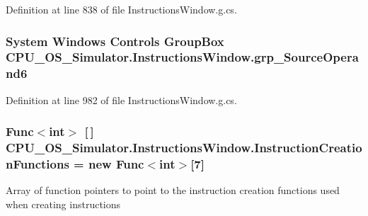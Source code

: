 Definition at line 838 of file Instructions\+Window.\+g.\+cs.

\hypertarget{class_c_p_u___o_s___simulator_1_1_instructions_window_a46c1f50385d01108637e574343a99bfd}{}
\subsubsection[{grp\+\_\+\+Source\+Operand6}]{\setlength{\rightskip}{0pt plus 5cm}System Windows Controls Group\+Box C\+P\+U\+\_\+\+O\+S\+\_\+\+Simulator.\+Instructions\+Window.\+grp\+\_\+\+Source\+Operand6\hspace{0.3cm}{\ttfamily [package]}}\label{class_c_p_u___o_s___simulator_1_1_instructions_window_a46c1f50385d01108637e574343a99bfd}


Definition at line 982 of file Instructions\+Window.\+g.\+cs.

\hypertarget{class_c_p_u___o_s___simulator_1_1_instructions_window_ae303b32cfc2f5e7cc5ab18df94fd574b}{}
\subsubsection[{Instruction\+Creation\+Functions}]{\setlength{\rightskip}{0pt plus 5cm}Func$<$int$>$ \mbox{[}$\,$\mbox{]} C\+P\+U\+\_\+\+O\+S\+\_\+\+Simulator.\+Instructions\+Window.\+Instruction\+Creation\+Functions = new Func$<$int$>$\mbox{[}7\mbox{]}\hspace{0.3cm}{\ttfamily [private]}}\label{class_c_p_u___o_s___simulator_1_1_instructions_window_ae303b32cfc2f5e7cc5ab18df94fd574b}


Array of function pointers to point to the instruction creation functions used when creating instructions 



